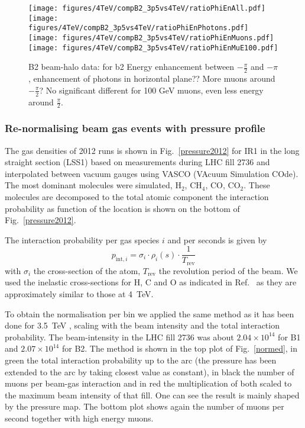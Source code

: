 \begin{figure}
\begin{center}
  \texttt{[image: figures/4TeV/compB2\_3p5vs4TeV/ratioPhiEnAll.pdf]}
  \texttt{[image: figures/4TeV/compB2\_3p5vs4TeV/ratioPhiEnPhotons.pdf]}
  \texttt{[image: figures/4TeV/compB2\_3p5vs4TeV/ratioPhiEnMuons.pdf]}
  \texttt{[image: figures/4TeV/compB2\_3p5vs4TeV/ratioPhiEnMuE100.pdf]}
\end{center}
\vspace{-0.6cm}
 \caption{B2 beam-halo data: for b2 Energy enhancement between $-\frac{\pi}{2}$ and $-\pi$, enhancement of photons in horizontal plane?? More muons around $-\frac{\pi}{2}$? No significant different for 100 GeV muons, even less energy around $\frac{\pi}{2}$.
  \label{xingCompBH2}}
\end{figure}


\subsubsection{Re-normalising beam gas events with pressure profile}

The gas densities of 2012 runs is shown in Fig.~\ref{pressure2012} for IR1 in the long straight section (LSS1) based on measurements during LHC fill 2736 and interpolated between vacuum gauges using VASCO (VAcuum Simulation COde). The most dominant molecules were simulated, H$_2$, CH$_4$, CO, CO$_2$. These molecules are decomposed to the total atomic component the interaction probability as function of the location is shown on the bottom of Fig.~\ref{pressure2012}.

The interaction probability per gas species $i$ and per seconds is given by 
\begin{equation} \label{eq2}
p_{\mathrm{int},i} = \sigma_{i} \cdot \rho_{i}(s) \cdot \frac{1}{T_{\mathrm{rev}}}
\end{equation}
with $\sigma_i$ the cross-section of the atom, $T_{\mathrm{rev}}$ the revolution period of the beam. We used the inelastic cross-sections for H, C and O as indicated in Ref.~\cite{nimPaperRod} as they are approximately similar to those at 4~TeV.

To obtain the normalisation per bin we applied the same method as it has been done for 3.5~TeV \cite{nimPaperRod}, scaling with the beam intensity and the total interaction probability. The beam-intensity in the LHC fill 2736 was about $2.04 \times 10^{14}$ for B1 and $2.07 \times 10^{14}$ for B2. The method is shown in the top plot of Fig.~\ref{normed}, in green the total interaction probability up to the arc (the pressure has been extended to the arc by taking closest value as constant), in black the number of muons per beam-gas interaction and in red the multiplication of both scaled to the maximum beam intensity of that fill. One can see the result is mainly shaped by the pressure map. The bottom plot shows again the number of muons per second together with high energy muons. 


